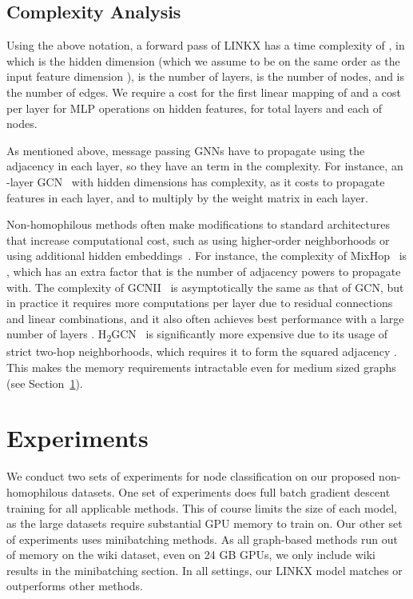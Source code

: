 \documentclass{article}
\begin{document}
\subsection{Complexity Analysis}\label{sec:complexity}
Using the above notation, a forward pass of LINKX has a time complexity of , in which  is the hidden dimension (which we assume to be on the same order as the input feature dimension ),  is the number of layers,  is the number of nodes, and  is the number of edges. We require a  cost for the first linear mapping of   and a  cost per layer for MLP operations on hidden features, for  total layers and each of  nodes.

As mentioned above, message passing GNNs have to propagate using the adjacency in each layer, so they have an  term in the complexity. For instance, an -layer GCN~\cite{kipf2017semi} with  hidden dimensions has  complexity, as it costs  to propagate features in each layer, and  to multiply by the weight matrix in each layer.

Non-homophilous methods often make modifications to standard architectures that increase computational cost, such as using higher-order neighborhoods or using additional hidden embeddings~\cite{zhu2020beyond}. For instance, the complexity of MixHop~\cite{abu2019mixhop} is , which has an extra factor  that is the number of adjacency powers to propagate with. The complexity of GCNII~\cite{chen2020simple} is asymptotically the same as that of GCN, but in practice it requires more computations per layer due to residual connections and linear combinations, and it also often achieves best performance with a large number of layers . H\textsubscript{2}GCN~\cite{zhu2020beyond} is significantly more expensive due to its usage of strict two-hop neighborhoods, which requires it to form the squared adjacency . This makes the memory requirements intractable even for medium sized graphs (see Section~\ref{sec:experiments}). 



\section{Experiments}\label{sec:experiments}


We conduct two sets of experiments for node classification on our proposed non-homophilous datasets. One set of experiments does full batch gradient descent training for all applicable methods. This of course limits the size of each model, as the large datasets require substantial GPU memory to train on. Our other set of experiments uses minibatching methods.
As all graph-based methods run out of memory on the wiki dataset, even on 24 GB GPUs, we only include wiki results in the minibatching section.
In all settings, our LINKX model matches or outperforms other methods.
\end{document}
